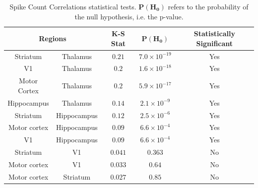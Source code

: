 \documentclass[a4paper,12pt]{article}
\theoremstyle{definition}
\begin{document}
\begin{table}[ht!]
  \begin{center}
    \caption{Spike Count Correlations statistical tests. $\mathbf{P(H_0)}$ refers to the probability of the null hypothesis, i.e. the p-value.}
    \label{tab:corr_ks_test}
    \begin{tabular}{c|c|c|c|c} %
      \multicolumn{2}{c|}{\textbf{Regions}} & \textbf{K-S Stat} & $\mathbf{P(H_0)}$ & \textbf{Statistically Significant}\\
      \hline
      Striatum & Thalamus & $0.21$ & $7.0 \times 10^{-19}$ & Yes \\
      V1 & Thalamus & $0.2$ & $1.6 \times 10^{-18}$ & Yes \\
      Motor Cortex & Thalamus  & $0.2$ & $5.9 \times 10^{-17}$ & Yes \\
      Hippocampus & Thalamus  & $0.14$ & $2.1 \times 10^{-9}$ & Yes \\
      Striatum & Hippocampus & $0.12$ & $2.5 \times 10^{-6}$ & Yes \\
      Motor cortex & Hippocampus & $0.09$ & $6.6 \times 10^{-4}$ & Yes \\
      V1 & Hippocampus & $0.09$ & $6.6 \times 10^{-4}$ & Yes \\
      Striatum & V1 & $0.041$ & $0.363$ & No \\
      Motor cortex & V1 & $0.033$ & $0.64$ & No \\
      Motor cortex & Striatum & $0.027$ & $0.85$ & No \\
    \end{tabular}
  \end{center}
\end{table}
\end{document}
